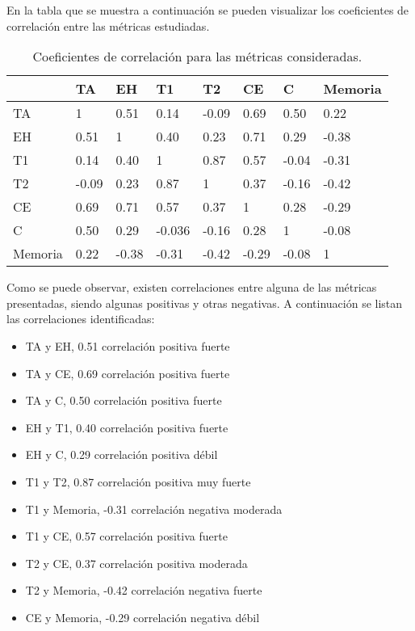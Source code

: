 En la tabla que se muestra a continuaci\'on se pueden visualizar los coeficientes de correlaci\'on entre las m\'etricas estudiadas.

\begin{table}[H]
\centering
\footnotesize
\begin{tabular}{|p{1.6cm}|p{1.6cm}|p{1.6cm}|p{1.6cm}|p{1.6cm}|p{1.6cm}|p{1.6cm}|p{1.6cm}|}
\hline
          &    TA & EH    & T1     & T2    & CE    & C      & Memoria \\
\hline
TA        & 1     & 0.51  & 0.14   & -0.09 & 0.69  & 0.50   & 0.22  \\
EH        & 0.51  & 1     & 0.40   & 0.23  & 0.71  & 0.29   & -0.38 \\
T1        & 0.14  & 0.40  & 1      & 0.87  & 0.57  & -0.04  & -0.31 \\
T2        & -0.09 & 0.23  & 0.87   & 1     & 0.37  & -0.16  & -0.42 \\
CE        & 0.69  & 0.71  & 0.57   & 0.37  & 1     & 0.28   & -0.29 \\
C         & 0.50  & 0.29  & -0.036 & -0.16 & 0.28  & 1      & -0.08 \\
Memoria   & 0.22  & -0.38 & -0.31  & -0.42 & -0.29 & -0.08  & 1     \\
\hline
\end{tabular}
\caption{Coeficientes de correlaci\'on para las m\'etricas consideradas.}
\label{sec:tabla-correlacion}
\end{table}

Como se puede observar, existen correlaciones entre alguna de las m\'etricas presentadas, 
siendo algunas positivas y otras negativas. A continuaci\'on se listan las correlaciones identificadas:

\begin{itemize}
    \item TA y EH, 0.51 correlaci\'on positiva fuerte
    \item TA y CE, 0.69 correlaci\'on positiva fuerte
    \item TA y C, 0.50 correlaci\'on positiva fuerte 
    \item EH y T1, 0.40 correlaci\'on positiva fuerte
    \item EH y C, 0.29 correlaci\'on positiva d\'ebil
    \item T1 y T2, 0.87 correlaci\'on positiva muy fuerte
    \item T1 y Memoria, -0.31 correlaci\'on negativa moderada
    \item T1 y CE, 0.57 correlaci\'on positiva fuerte
    \item T2 y CE, 0.37 correlaci\'on positiva moderada
    \item T2 y Memoria, -0.42 correlaci\'on negativa fuerte
    \item CE y Memoria, -0.29 correlaci\'on negativa d\'ebil
\end{itemize}
